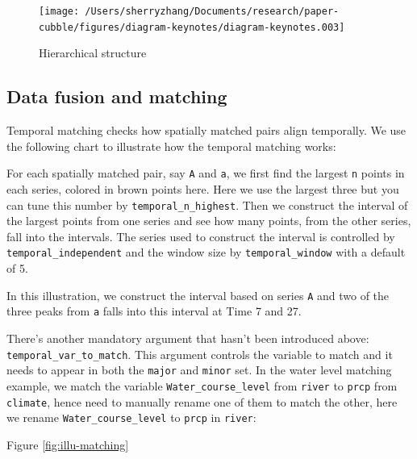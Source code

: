 \documentclass[
]{jss}
\begin{document}
\begin{CodeChunk}
\begin{figure}

{\centering \texttt{[image: /Users/sherryzhang/Documents/research/paper-cubble/figures/diagram-keynotes/diagram-keynotes.003]} 

}

\caption[Hierarchical structure]{Hierarchical structure}\label{fig:illu-hier}
\end{figure}
\end{CodeChunk}

\hypertarget{data-fusion-and-matching}{%
\subsection{Data fusion and matching}\label{data-fusion-and-matching}}

Temporal matching checks how spatially matched pairs align temporally.
We use the following chart to illustrate how the temporal matching
works:

For each spatially matched pair, say \texttt{A} and \texttt{a}, we first
find the largest \texttt{n} points in each series, colored in brown
points here. Here we use the largest three but you can tune this number
by \texttt{temporal\_n\_highest}. Then we construct the interval of the
largest points from one series and see how many points, from the other
series, fall into the intervals. The series used to construct the
interval is controlled by \texttt{temporal\_independent} and the window
size by \texttt{temporal\_window} with a default of 5.

In this illustration, we construct the interval based on series
\texttt{A} and two of the three peaks from \texttt{a} falls into this
interval at Time 7 and 27.

There's another mandatory argument that hasn't been introduced above:
\texttt{temporal\_var\_to\_match}. This argument controls the variable
to match and it needs to appear in both the \texttt{major} and
\texttt{minor} set. In the water level matching example, we match the
variable \texttt{Water\_course\_level} from \texttt{river} to
\texttt{prcp} from \texttt{climate}, hence need to manually rename one
of them to match the other, here we rename \texttt{Water\_course\_level}
to \texttt{prcp} in \texttt{river}:

Figure \ref{fig:illu-matching}
\end{document}
